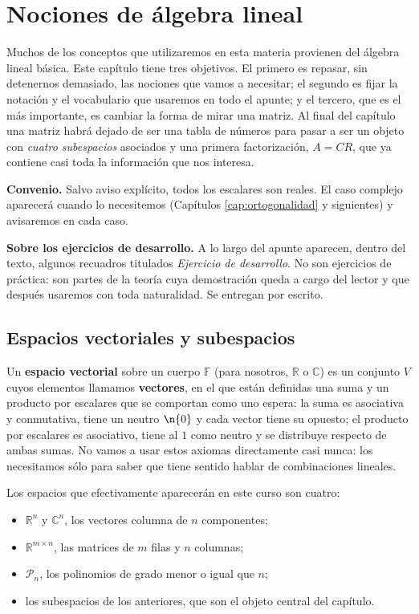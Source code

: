 \chapter{Nociones de álgebra lineal}\label{cap:algebra-lineal}

Muchos de los conceptos que utilizaremos en esta materia provienen del álgebra
lineal básica. Este capítulo tiene tres objetivos. El primero es repasar, sin
detenernos demasiado, las nociones que vamos a necesitar; el segundo es fijar la
notación y el vocabulario que usaremos en todo el apunte; y el tercero, que es
el más importante, es cambiar la forma de mirar una matriz. Al final del
capítulo una matriz habrá dejado de ser una tabla de números para pasar a ser un
objeto con \emph{cuatro subespacios} asociados y una primera factorización,
$A=CR$, que ya contiene casi toda la información que nos interesa.

\medskip

\noindent\textbf{Convenio.} Salvo aviso explícito, todos los escalares son
reales. El caso complejo aparecerá cuando lo necesitemos (Capítulos
\ref{cap:ortogonalidad} y siguientes) y avisaremos en cada caso.

\medskip

\noindent\textbf{Sobre los ejercicios de desarrollo.} A lo largo del apunte
aparecen, dentro del texto, algunos recuadros titulados \emph{Ejercicio de
desarrollo}. No son ejercicios de práctica: son partes de la teoría cuya
demostración queda a cargo del lector y que después usaremos con toda
naturalidad. Se entregan por escrito.

\section{Espacios vectoriales y subespacios}
\label{sec:espacios_vectoriales}

Un \textbf{espacio vectorial} sobre un cuerpo $\mathbb{F}$ (para nosotros,
$\mathbb{R}$ o $\mathbb{C}$) es un conjunto $V$ cuyos elementos llamamos
\textbf{vectores}, en el que están definidas una suma y un producto por
escalares que se comportan como uno espera: la suma es asociativa y conmutativa,
tiene un neutro $\n{0}$ y cada vector tiene su opuesto; el producto por
escalares es asociativo, tiene al $1$ como neutro y se distribuye respecto de
ambas sumas. No vamos a usar estos axiomas directamente casi nunca: los
necesitamos sólo para saber que tiene sentido hablar de combinaciones lineales.

Los espacios que efectivamente aparecerán en este curso son cuatro:
\begin{itemize}[itemsep=1pt]
\item $\mathbb{R}^n$ y $\mathbb{C}^n$, los vectores columna de $n$ componentes;
\item $\mathbb{R}^{m\times n}$, las matrices de $m$ filas y $n$ columnas;
\item $\mathcal{P}_n$, los polinomios de grado menor o igual que $n$;
\item los subespacios de los anteriores, que son el objeto central del capítulo.
\end{itemize}

